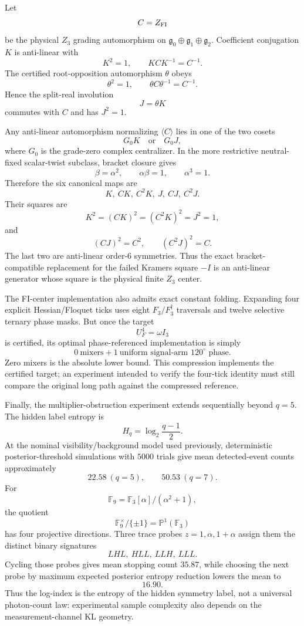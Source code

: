 Let
\[
C=Z_{\rm FI}
\]
be the physical $Z_3$ grading automorphism on
$\mathfrak g_0\oplus\mathfrak g_1\oplus\mathfrak g_2$.  Coefficient
conjugation $K$ is anti-linear with
\[
K^2=1,
\qquad
KCK^{-1}=C^{-1}.
\]
The certified root-opposition automorphism $\theta$ obeys
\[
\theta^2=1,
\qquad
\theta C\theta^{-1}=C^{-1}.
\]
Hence the split-real involution
\[
J=\theta K
\]
commutes with $C$ and has $J^2=1$.

Any anti-linear automorphism normalizing $\langle C\rangle$ lies in one of
the two cosets
\[
\boxed{
G_0K
\quad\text{or}\quad
G_0J,
}
\]
where $G_0$ is the grade-zero complex centralizer.  In the more restrictive
neutral-fixed scalar-twist subclass, bracket closure gives
\[
\beta=\alpha^2,
\qquad
\alpha\beta=1,
\qquad
\alpha^3=1.
\]
Therefore the six canonical maps are
\[
K,\ CK,\ C^2K,\ J,\ CJ,\ C^2J.
\]
Their squares are
\[
\boxed{
K^2=(CK)^2=(C^2K)^2=J^2=1,
}
\]
and
\[
\boxed{
(CJ)^2=C^2,
\qquad
(C^2J)^2=C.
}
\]
The last two are anti-linear order-$6$ symmetries.  Thus the exact
bracket-compatible replacement for the failed Kramers square $-I$ is an
anti-linear generator whose square is the physical finite $Z_3$ center.

The FI-center implementation also admits exact constant folding.  Expanding
four explicit Hessian/Floquet ticks uses eight $F_3/F_3^\dagger$ traversals
and twelve selective ternary phase masks.  But once the target
\[
U_F^4=\omega I_3
\]
is certified, its optimal phase-referenced implementation is simply
\[
\boxed{
0\ \text{mixers}
+
1\ \text{uniform signal-arm }120^\circ\text{ phase}.
}
\]
Zero mixers is the absolute lower bound.  This compression implements the
certified target; an experiment intended to verify the four-tick identity must
still compare the original long path against the compressed reference.

Finally, the multiplier-obstruction experiment extends sequentially beyond
$q=5$.  The hidden label entropy is
\[
H_q=\log_2\frac{q-1}{2}.
\]
At the nominal visibility/background model used previously, deterministic
posterior-threshold simulations with $5000$ trials give mean detected-event
counts approximately
\[
\boxed{
22.58\ (q=5),\qquad
50.53\ (q=7).
}
\]
For
\[
\mathbb F_9=\mathbb F_3[\alpha]/(\alpha^2+1),
\]
the quotient
\[
\boxed{
\mathbb F_9^\times/\{\pm1\}
=
\mathbb P^1(\mathbb F_3)
}
\]
has four projective directions.  Three trace probes
$z=1,\alpha,1+\alpha$ assign them the distinct binary signatures
\[
LHL,\ HLL,\ LLH,\ LLL.
\]
Cycling those probes gives mean stopping count $35.87$, while choosing the
next probe by maximum expected posterior entropy reduction lowers the mean to
\[
\boxed{16.90}.
\]
Thus the log-index is the entropy of the hidden symmetry label, not a universal
photon-count law: experimental sample complexity also depends on the
measurement-channel KL geometry.

